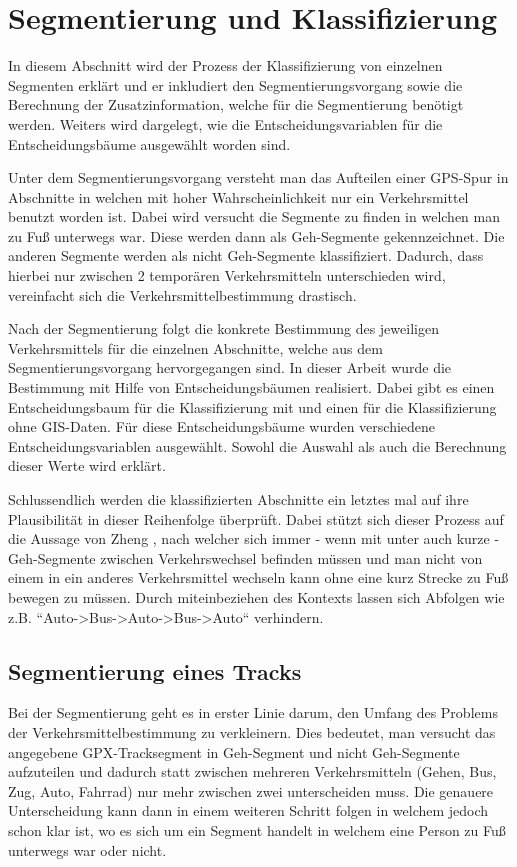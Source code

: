 \chapter{Segmentierung und Klassifizierung}
In diesem Abschnitt wird der Prozess der Klassifizierung von einzelnen Segmenten erklärt und er inkludiert den Segmentierungsvorgang sowie die Berechnung der Zusatzinformation, welche für die Segmentierung benötigt werden. Weiters wird dargelegt, wie die Entscheidungsvariablen für die Entscheidungsbäume ausgewählt worden sind. 

Unter dem Segmentierungsvorgang versteht man das Aufteilen einer GPS-Spur in Abschnitte in welchen mit hoher Wahrscheinlichkeit nur ein Verkehrsmittel benutzt worden ist. Dabei wird versucht die Segmente zu finden in welchen man zu Fuß unterwegs war. Diese werden dann als Geh-Segmente gekennzeichnet. Die anderen Segmente werden als nicht Geh-Segmente klassifiziert. Dadurch, dass hierbei nur zwischen 2 temporären Verkehrsmitteln unterschieden wird, vereinfacht sich die  Verkehrsmittelbestimmung drastisch.

Nach der Segmentierung folgt die konkrete Bestimmung des jeweiligen Verkehrsmittels für die einzelnen Abschnitte, welche aus dem Segmentierungsvorgang hervorgegangen sind. In dieser Arbeit wurde die Bestimmung mit Hilfe von Entscheidungsbäumen realisiert. Dabei gibt es einen Entscheidungsbaum für die Klassifizierung mit und einen für die Klassifizierung ohne GIS-Daten. Für diese Entscheidungsbäume wurden verschiedene Entscheidungsvariablen ausgewählt. Sowohl die Auswahl als auch die Berechnung dieser Werte wird erklärt.

Schlussendlich werden die klassifizierten Abschnitte ein letztes mal auf ihre Plausibilität in dieser Reihenfolge überprüft. Dabei stützt sich dieser Prozess auf die Aussage von Zheng \cite{zheng_understanding_2010}, nach welcher sich immer - wenn mit unter auch kurze - Geh-Segmente zwischen Verkehrswechsel befinden müssen und man nicht von einem in ein anderes Verkehrsmittel wechseln kann ohne eine kurz Strecke zu Fuß bewegen zu müssen. Durch miteinbeziehen des Kontexts lassen sich Abfolgen wie z.B. ``Auto->Bus->Auto->Bus->Auto`` verhindern.  
\clearpage

\section{Segmentierung eines Tracks}
\label{segmentierung}
Bei der Segmentierung geht es in erster Linie darum, den Umfang des Problems der Verkehrsmittelbestimmung zu verkleinern. Dies bedeutet, man versucht das angegebene GPX-Tracksegment in Geh-Segment und nicht Geh-Segmente aufzuteilen und dadurch statt zwischen mehreren Verkehrsmitteln (Gehen, Bus, Zug, Auto, Fahrrad) nur mehr zwischen zwei unterscheiden muss. Die genauere Unterscheidung kann dann in einem weiteren Schritt folgen in welchem jedoch schon klar ist, wo es sich um ein Segment handelt in welchem eine Person zu Fuß unterwegs war oder nicht. 

